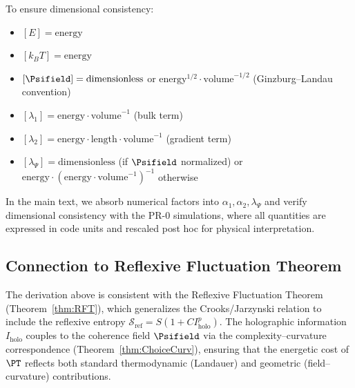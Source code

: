 To ensure dimensional consistency:
\begin{itemize}[leftmargin=1.2em]
  \item \([E] = \mathrm{energy}\)
  \item \([k_B T] = \mathrm{energy}\)
  \item \([\Psifield] = \mathrm{dimensionless}\) or \(\mathrm{energy}^{1/2}\cdot\mathrm{volume}^{-1/2}\) (Ginzburg--Landau convention)
  \item \([\lambda_1] = \mathrm{energy}\cdot\mathrm{volume}^{-1}\) (bulk term)
  \item \([\lambda_2] = \mathrm{energy}\cdot\mathrm{length}\cdot\mathrm{volume}^{-1}\) (gradient term)
  \item \([\lambda_\Psi] = \mathrm{dimensionless}\) (if \(\Psifield\) normalized) or \(\mathrm{energy}\cdot(\mathrm{energy}\cdot\mathrm{volume}^{-1})^{-1}\) otherwise
\end{itemize}

In the main text, we absorb numerical factors into \(\alpha_1,\alpha_2,\lambda_\Psi\) and verify dimensional consistency with the PR-0 simulations, where all quantities are expressed in code units and rescaled post hoc for physical interpretation.

\subsection{Connection to Reflexive Fluctuation Theorem}

The derivation above is consistent with the Reflexive Fluctuation Theorem (Theorem~\ref{thm:RFT}), which generalizes the Crooks/Jarzynski relation to include the reflexive entropy \(\mathcal{S}_{\mathrm{ref}} = S(1 + C I_{\mathrm{holo}}^p)\). The holographic information \(I_{\mathrm{holo}}\) couples to the coherence field \(\Psifield\) via the complexity--curvature correspondence (Theorem~\ref{thm:ChoiceCurv}), ensuring that the energetic cost of \(\PT\) reflects both standard thermodynamic (Landauer) and geometric (field--curvature) contributions.


